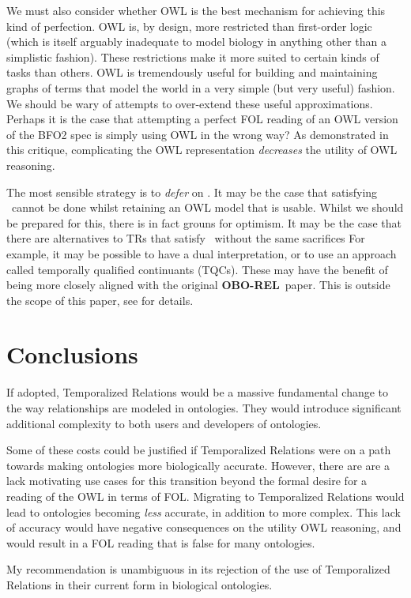 \documentclass{bioinfo}
\def\P1{\pr{P-1}}
\def\OBOREL{\textbf{OBO-REL}}
\begin{document}
We must also consider whether OWL is the best mechanism for achieving
this kind of perfection. OWL is, by design, more restricted than
first-order logic (which is itself arguably inadequate to model
biology in anything other than a simplistic fashion). These
restrictions make it more suited to certain kinds of tasks than
others. OWL is tremendously useful for building and maintaining graphs
of terms that model the world in a very simple (but very useful)
fashion. We should be wary of attempts to over-extend these useful
approximations. Perhaps it is the case that attempting a perfect FOL
reading of an OWL version of the BFO2 spec is simply using OWL in the
wrong way? As demonstrated in this critique, complicating the OWL
representation \emph{decreases} the utility of OWL reasoning.

The most sensible strategy is to \emph{defer} on \P1. It may be the
case that satisfying \P1\ cannot be done whilst retaining an OWL model
that is usable. Whilst we should be prepared for this, there is in
fact grouns for optimism. It may be the case that there are
alternatives to TRs that satisfy \P1\ without the same sacrifices For
example, it may be possible to have a dual interpretation, or to use
an approach called temporally qualified continuants (TQCs). These may
have the benefit of being more closely aligned with the original
\OBOREL\ paper. This is outside the scope of this paper, see
\cite{Grewe} for details.

\section{Conclusions}

If adopted, Temporalized Relations would be a massive fundamental
change to the way relationships are modeled in ontologies. They would
introduce significant additional complexity to both users and
developers of ontologies.

Some of these costs could be justified if Temporalized Relations were
on a path towards making ontologies more biologically
accurate. However, there are are a lack motivating use cases for this
transition beyond the formal desire for a reading of the OWL in terms
of FOL. Migrating to Temporalized Relations would lead to ontologies
becoming \emph{less} accurate, in addition to more complex. This lack
of accuracy would have negative consequences on the utility OWL
reasoning, and would result in a FOL reading that is false for many
ontologies.

My recommendation is unambiguous in its rejection of the use of
Temporalized Relations in their current form in biological ontologies.
\end{document}
